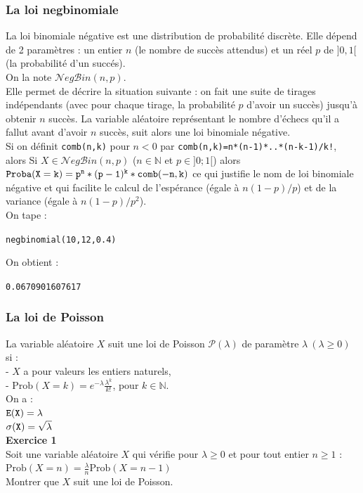 \documentclass[a4paper,11pt]{book}
\newcommand{\N}{{\mathbb{N}}}
\begin{document}
\subsubsection{La loi negbinomiale}
La loi binomiale n\'egative est une distribution de probabilit\'e 
discr\`ete. Elle d\'epend de 2 param\`etres : un entier $n$ (le nombre de 
succ\`es attendus) et un r\'eel $p$ de $]0,1[$ (la probabilité d'un succ\'es).\\
On la note  $\mathcal{N}eg\mathcal{B}in(n,p)$.\\  
Elle permet de d\'ecrire la situation suivante : on fait une suite de tirages 
ind\'ependants (avec pour chaque tirage, la probabilit\'e $p$ d'avoir un 
succ\`es) jusqu'\`a obtenir $n$ succ\`es.
La variable al\'eatoire représentant le nombre d'\'echecs qu'il a fallut avant 
d'avoir $n$ succ\`es, suit alors une loi binomiale n\'egative. \\
Si on d\'efinit {\tt comb(n,k)} pour $n<0$ par {\tt comb(n,k)=n*(n-1)*..*(n-k-1)/k!}, alors
Si $X \in \mathcal{N}eg\mathcal{B}in(n,p)$ ($n \in \N$ et $p \in ]0;1[$) alors
${\tt Proba(X=k)=p^n*(p-1)^k*comb(-n,k)}$
ce qui justifie le nom de loi binomiale n\'egative et qui facilite le calcul de
l'esp\'erance (\'egale \`a $n(1-p)/p$) et de la variance (\'egale \`a 
$n(1-p)/p^2$).\\
On tape :
\begin{center}{\tt negbinomial(10,12,0.4)}\end{center}
On obtient :
\begin{center}{\tt 0.0670901607617}\end{center}

\subsubsection{La loi de Poisson}\label{sec:poisson}
La variable al\'eatoire $X$ suit une loi de Poisson $\mathcal P(\lambda)$
de param\`etre $\lambda\ (\lambda \geq 0)$ si :\\
- $X$ a pour valeurs les entiers naturels,\\
- $\displaystyle \mbox{Prob}(X=k)=e^{-\lambda}\frac{\lambda^k}{k!}$, pour $k\in \N$.\\
On a :\\
${\tt E(X)=\lambda}$\\
${\tt \sigma(X)=\sqrt \lambda}$\\
{\bf Exercice 1}\\
Soit une variable al\'eatoire $X$ qui v\'erifie pour $\lambda \geq 0$ et pour 
tout entier $n \geq 1$ :\\
$\displaystyle \mbox{Prob}(X=n)=\frac{\lambda}{n}\mbox{Prob}(X=n-1)$\\
Montrer que $X$ suit une loi de Poisson.\\
\end{document}
